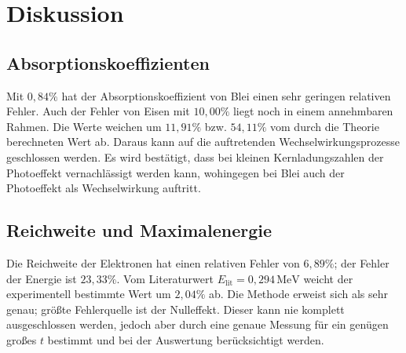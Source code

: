 \section{Diskussion}
\label{sec:Diskussion}
\subsection{Absorptionskoeffizienten}
Mit $0,84\%$ hat der Absorptionskoeffizient von Blei einen sehr geringen relativen Fehler. Auch der Fehler von Eisen mit $10,00\%$ liegt noch in einem annehmbaren Rahmen. Die Werte weichen um $11,91\%$ bzw. $54,11\%$ vom durch die Theorie berechneten Wert ab. Daraus kann auf die auftretenden Wechselwirkungsprozesse geschlossen werden. Es wird bestätigt, dass bei kleinen Kernladungszahlen der Photoeffekt vernachlässigt werden kann, wohingegen bei Blei auch der Photoeffekt als Wechselwirkung auftritt.
\subsection{Reichweite und Maximalenergie}
Die Reichweite der Elektronen hat einen relativen Fehler von $6,89\%$; der Fehler der Energie ist $23,33\%$. Vom Literaturwert $E_\mathup{lit}=0,294\,\si{\mega}\mathup{e}\si\volt$ weicht der experimentell bestimmte Wert um $2,04\%$ ab. Die Methode erweist sich als sehr genau; größte Fehlerquelle ist der Nulleffekt. Dieser kann nie komplett ausgeschlossen werden, jedoch aber durch eine genaue Messung für ein genügen großes $t$ bestimmt und bei der Auswertung berücksichtigt werden.
